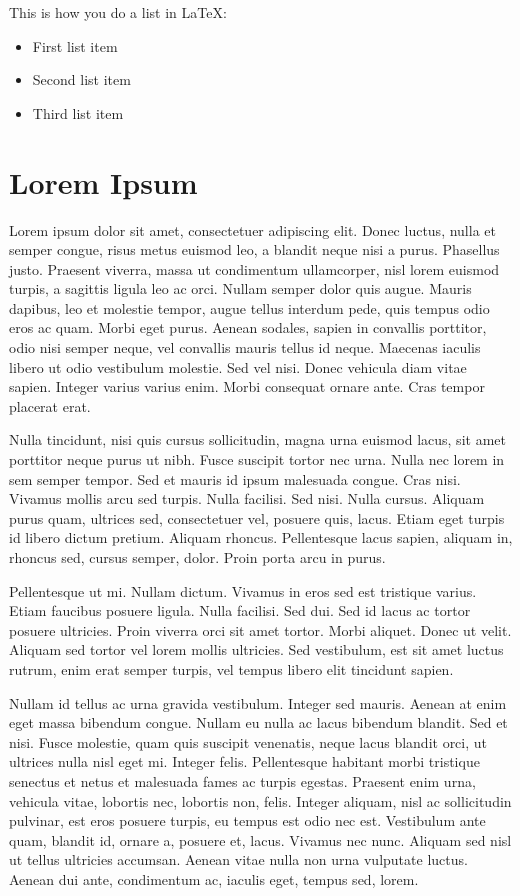 \documentclass[journal]{vgtc}                %
\begin{document}
This is how you do a list in LaTeX:
\begin{itemize}
\item First list item
\item Second list item
\item Third list item
\end{itemize}

\section{Lorem Ipsum}
Lorem ipsum dolor sit amet, consectetuer adipiscing elit. Donec luctus, nulla et semper congue, risus metus euismod leo, a blandit neque nisi a purus. Phasellus justo. Praesent viverra, massa ut condimentum ullamcorper, nisl lorem euismod turpis, a sagittis ligula leo ac orci. Nullam semper dolor quis augue. Mauris dapibus, leo et molestie tempor, augue tellus interdum pede, quis tempus odio eros ac quam. Morbi eget purus. Aenean sodales, sapien in convallis porttitor, odio nisi semper neque, vel convallis mauris tellus id neque. Maecenas iaculis libero ut odio vestibulum molestie. Sed vel nisi. Donec vehicula diam vitae sapien. Integer varius varius enim. Morbi consequat ornare ante. Cras tempor placerat erat.

Nulla tincidunt, nisi quis cursus sollicitudin, magna urna euismod lacus, sit amet porttitor neque purus ut nibh. Fusce suscipit tortor nec urna. Nulla nec lorem in sem semper tempor. Sed et mauris id ipsum malesuada congue. Cras nisi. Vivamus mollis arcu sed turpis. Nulla facilisi. Sed nisi. Nulla cursus. Aliquam purus quam, ultrices sed, consectetuer vel, posuere quis, lacus. Etiam eget turpis id libero dictum pretium. Aliquam rhoncus. Pellentesque lacus sapien, aliquam in, rhoncus sed, cursus semper, dolor. Proin porta arcu in purus.

Pellentesque ut mi. Nullam dictum. Vivamus in eros sed est tristique varius. Etiam faucibus posuere ligula. Nulla facilisi. Sed dui. Sed id lacus ac tortor posuere ultricies. Proin viverra orci sit amet tortor. Morbi aliquet. Donec ut velit. Aliquam sed tortor vel lorem mollis ultricies. Sed vestibulum, est sit amet luctus rutrum, enim erat semper turpis, vel tempus libero elit tincidunt sapien.

Nullam id tellus ac urna gravida vestibulum. Integer sed mauris. Aenean at enim eget massa bibendum congue. Nullam eu nulla ac lacus bibendum blandit. Sed et nisi. Fusce molestie, quam quis suscipit venenatis, neque lacus blandit orci, ut ultrices nulla nisl eget mi. Integer felis. Pellentesque habitant morbi tristique senectus et netus et malesuada fames ac turpis egestas. Praesent enim urna, vehicula vitae, lobortis nec, lobortis non, felis. Integer aliquam, nisl ac sollicitudin pulvinar, est eros posuere turpis, eu tempus est odio nec est. Vestibulum ante quam, blandit id, ornare a, posuere et, lacus. Vivamus nec nunc. Aliquam sed nisl ut tellus ultricies accumsan. Aenean vitae nulla non urna vulputate luctus. Aenean dui ante, condimentum ac, iaculis eget, tempus sed, lorem.
\end{document}
